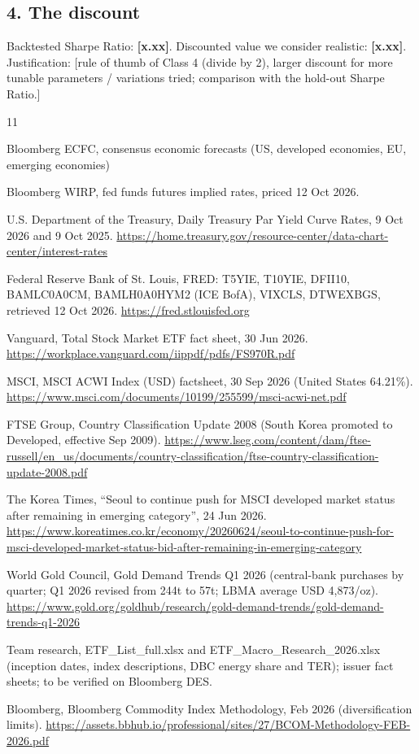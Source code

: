 \documentclass[11pt,a4paper]{article}
\newcommand{\todo}[1]{\textcolor{BrickRed}{[#1]}}
\begin{document}
\subsection*{4. The discount}
Backtested Sharpe Ratio: \textbf{\todo{x.xx}}. Discounted value we consider realistic: \textbf{\todo{x.xx}}.\\
Justification: \todo{rule of thumb of Class 4 (divide by 2), larger discount for more tunable parameters / variations tried;
comparison with the hold-out Sharpe Ratio.}

\renewcommand{\refname}{Sources}
\begin{thebibliography}{11}

 Bloomberg ECFC, consensus economic forecasts (US,
developed economies, EU, emerging economies)

 Bloomberg WIRP, fed funds futures implied rates, priced
12 Oct 2026.

 U.S. Department of the Treasury, Daily Treasury Par
Yield Curve Rates, 9 Oct 2026 and 9 Oct 2025.
\url{https://home.treasury.gov/resource-center/data-chart-center/interest-rates}

 Federal Reserve Bank of St. Louis, FRED: T5YIE, T10YIE,
DFII10, BAMLC0A0CM, BAMLH0A0HYM2 (ICE BofA), VIXCLS, DTWEXBGS, retrieved
12 Oct 2026. \url{https://fred.stlouisfed.org}

 Vanguard, Total Stock Market ETF fact sheet, 30 Jun
2026. \url{https://workplace.vanguard.com/iippdf/pdfs/FS970R.pdf}

 MSCI, MSCI ACWI Index (USD) factsheet, 30 Sep 2026
(United States 64.21\%).
\url{https://www.msci.com/documents/10199/255599/msci-acwi-net.pdf}

 FTSE Group, Country Classification Update 2008 (South
Korea promoted to Developed, effective Sep 2009).
\url{https://www.lseg.com/content/dam/ftse-russell/en_us/documents/country-classification/ftse-country-classification-update-2008.pdf}

 The Korea Times, ``Seoul to continue push for MSCI
developed market status after remaining in emerging category'', 24 Jun
2026.
\url{https://www.koreatimes.co.kr/economy/20260624/seoul-to-continue-push-for-msci-developed-market-status-bid-after-remaining-in-emerging-category}

 World Gold Council, Gold Demand Trends Q1 2026
(central-bank purchases by quarter; Q1 2026 revised from 244t to 57t;
LBMA average USD 4,873/oz).
\url{https://www.gold.org/goldhub/research/gold-demand-trends/gold-demand-trends-q1-2026}

 Team research, ETF\_List\_full.xlsx and
ETF\_Macro\_Research\_2026.xlsx (inception dates, index descriptions,
DBC energy share and TER); issuer fact sheets; to be verified on
Bloomberg DES.

 Bloomberg, Bloomberg Commodity Index Methodology, Feb
2026 (diversification limits).
\url{https://assets.bbhub.io/professional/sites/27/BCOM-Methodology-FEB-2026.pdf}

\end{thebibliography}
\end{document}
